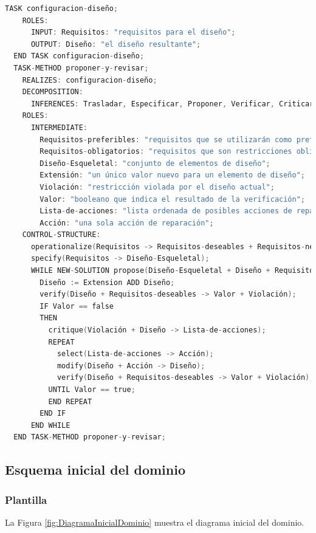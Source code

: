 \newpage

\begin{lstlisting}[language=C,caption=\textbf{Código de la plantilla de configuración}]
  TASK configuracion-diseño;
    ROLES:
      INPUT: Requisitos: "requisitos para el diseño";
      OUTPUT: Diseño: "el diseño resultante";
  END TASK configuracion-diseño;
  TASK-METHOD proponer-y-revisar;
    REALIZES: configuracion-diseño;
    DECOMPOSITION:
      INFERENCES: Trasladar, Especificar, Proponer, Verificar, Criticar, Seleccionar, Modificar;
    ROLES:
      INTERMEDIATE:
        Requisitos-preferibles: "requisitos que se utilizarán como preferencias (suaves)";
        Requisitos-obligatorios: "requisitos que son restricciones obligatorias (estrictas)";
        Diseño-Esqueletal: "conjunto de elementos de diseño";
        Extensión: "un único valor nuevo para un elemento de diseño";
        Violación: "restricción violada por el diseño actual";
        Valor: "booleano que indica el resultado de la verificación";
        Lista-de-acciones: "lista ordenada de posibles acciones de reparación (fijación)";
        Acción: "una sola acción de reparación";
    CONTROL-STRUCTURE:
      operationalize(Requisitos -> Requisitos-deseables + Requisitos-necesarios);
      specify(Requisitos -> Diseño-Esqueletal);
      WHILE NEW-SOLUTION propose(Diseño-Esqueletal + Diseño + Requisitos-necesarios -> Extensión) DO
        Diseño := Extension ADD Diseño;
        verify(Diseño + Requisitos-deseables -> Valor + Violación);
        IF Valor == false
        THEN
          critique(Violación + Diseño -> Lista-de-acciones);
          REPEAT
            select(Lista-de-acciones -> Acción);
            modify(Diseño + Acción -> Diseño);
            verify(Diseño + Requisitos-deseables -> Valor + Violación);
          UNTIL Valor == true;
          END REPEAT
        END IF
      END WHILE
  END TASK-METHOD proponer-y-revisar;
\end{lstlisting}

\subsection{Esquema inicial del dominio}

\subsubsection{Plantilla}
La Figura \ref{fig:DiagramaInicialDominio} muestra el diagrama inicial del dominio.

